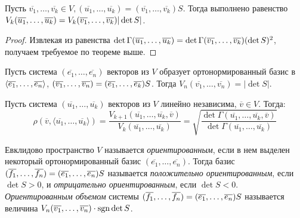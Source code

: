 \begin{corollary}
	Пусть $\overline{v_1}, \dotsc, \overline{v_k} \in V, (\overline{u_1}, \dots, \overline{u_k}) = (\overline{v_1}, \dots, \overline{v_k})S$. Тогда выполнено равенство $V_k(\overline{u_1}, \dots, \overline{u_k}) \hm{=} V_k(\overline{v_1}, \dots, \overline{v_k})|\det{S}|$.
\end{corollary}

\begin{proof}
	Извлекая из равенства $\det{\Gamma(\overline{u_1}, \dots, \overline{u_k})} \hm{=} \det{\Gamma(\overline{v_1}, \dots, \overline{v_k})}(\det{S})^2$, получаем требуемое по теореме выше.
\end{proof}

\begin{corollary}
	Пусть система $(\overline{e_1}, \dots, \overline{e_n})$ векторов из $V$ образует ортонормированный базис в $\langle\overline{e_1}, \dots, \overline{e_n}\rangle$, $(\overline{v_1}, \dots, \overline{v_n}) \hm= (\overline{e_1}, \dots, \overline{e_k})S$. Тогда $V_n(\overline{v_1}, \dots, \overline{v_n}) = |\det{S}|$.
\end{corollary}

\begin{corollary}
	Пусть система $(\overline{u_1}, \dots, \overline{u_k})$ векторов из $V$ линейно независима, $\overline{v} \in V$. Тогда:
	\[\rho(\overline{v}, \langle\overline{u_1}, \dots, \overline{u_k}\rangle) = \frac{V_{k + 1}(\overline{u_1}, \dots, \overline{u_k}, \overline{v})}{V_{k}(\overline{u_1}, \dots, \overline{u_k})} = \sqrt{\frac{\det{\Gamma(\overline{u_1}, \dots, \overline{u_k}, \overline{v})}}{\det{\Gamma(\overline{u_1}, \dots, \overline{u_k})}}}\]
\end{corollary}

\begin{definition}
	Евклидово пространство $V$ называется \textit{ориентированным}, если в нем выделен некоторый ортонормированный базис $(\overline{e_1}, \dots, \overline{e_n})$. Тогда базис $(\overline{f_1}, \dots, \overline{f_n}) \hm= (\overline{e_1}, \dots, \overline{e_n})S$ называется \textit{положительно ориентированным}, если $\det{S} > 0$, и \textit{отрицательно ориентированным}, если $\det{S} < 0$. \textit{Ориентированным объемом} системы $(\overline{f_1}, \dots, \overline{f_n}) \hm= (\overline{e_1}, \dots, \overline{e_n})S$ называется величина $V_n(\overline{v_1}, \dots, \overline{v_n})\cdot\operatorname{\mathop{sgn}}\det{S}$.
\end{definition}